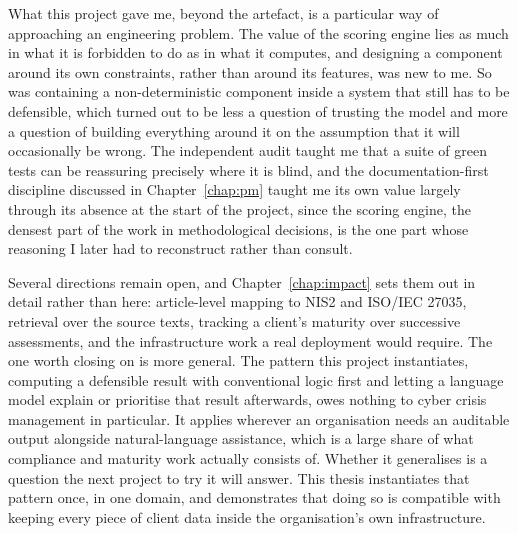 What this project gave me, beyond the artefact, is a particular way of
approaching an engineering problem. The value of the scoring engine lies as
much in what it is forbidden to do as in what it computes, and designing a
component around its own constraints, rather than around its features, was new
to me. So was containing a non-deterministic component inside a system that
still has to be defensible, which turned out to be less a question of trusting
the model and more a question of building everything around it on the
assumption that it will occasionally be wrong. The independent audit taught me
that a suite of green tests can be reassuring precisely where it is blind, and
the documentation-first discipline discussed in Chapter~\ref{chap:pm} taught me
its own value largely through its absence at the start of the project, since
the scoring engine, the densest part of the work in methodological decisions,
is the one part whose reasoning I later had to reconstruct rather than consult.

Several directions remain open, and Chapter~\ref{chap:impact} sets them out in
detail rather than here: article-level mapping to NIS2 and ISO/IEC 27035,
retrieval over the source texts, tracking a client's maturity over successive
assessments, and the infrastructure work a real deployment would require. The
one worth closing on is more general. The pattern this project instantiates,
computing a defensible result with conventional logic first and letting a
language model explain or prioritise that result afterwards, owes nothing to
cyber crisis management in particular. It applies wherever an organisation
needs an auditable output alongside natural-language assistance, which is a
large share of what compliance and maturity work actually consists of. Whether
it generalises is a question the next project to try it will answer. This
thesis instantiates that pattern once, in one domain, and demonstrates that
doing so is compatible with keeping every piece of client data inside the
organisation's own infrastructure.